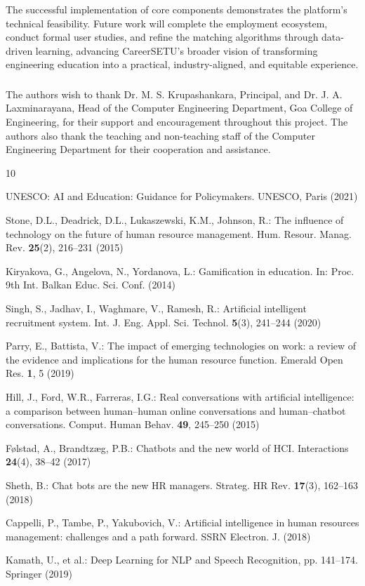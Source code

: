 \documentclass[runningheads]{llncs}
\begin{document}
The successful implementation of core components demonstrates the platform's technical feasibility. Future work will complete the employment ecosystem, conduct formal user studies, and refine the matching algorithms through data-driven learning, advancing CareerSETU's broader vision of transforming engineering education into a practical, industry-aligned, and equitable experience.

\begin{credits}
\subsubsection{\ackname} The authors wish to thank Dr. M. S. Krupashankara, Principal, and Dr. J. A. Laxminarayana, Head of the Computer Engineering Department, Goa College of Engineering, for their support and encouragement throughout this project. The authors also thank the teaching and non-teaching staff of the Computer Engineering Department for their cooperation and assistance.
\end{credits}

\begin{thebibliography}{10}

UNESCO: AI and Education: Guidance for Policymakers. UNESCO, Paris (2021)

Stone, D.L., Deadrick, D.L., Lukaszewski, K.M., Johnson, R.: The influence of technology on the future of human resource management. Hum. Resour. Manag. Rev. \textbf{25}(2), 216--231 (2015)

Kiryakova, G., Angelova, N., Yordanova, L.: Gamification in education. In: Proc. 9th Int. Balkan Educ. Sci. Conf. (2014)

Singh, S., Jadhav, I., Waghmare, V., Ramesh, R.: Artificial intelligent recruitment system. Int. J. Eng. Appl. Sci. Technol. \textbf{5}(3), 241--244 (2020)

Parry, E., Battista, V.: The impact of emerging technologies on work: a review of the evidence and implications for the human resource function. Emerald Open Res. \textbf{1}, 5 (2019)

Hill, J., Ford, W.R., Farreras, I.G.: Real conversations with artificial intelligence: a comparison between human--human online conversations and human--chatbot conversations. Comput. Human Behav. \textbf{49}, 245--250 (2015)

F\o lstad, A., Brandtz\ae g, P.B.: Chatbots and the new world of HCI. Interactions \textbf{24}(4), 38--42 (2017)

Sheth, B.: Chat bots are the new HR managers. Strateg. HR Rev. \textbf{17}(3), 162--163 (2018)

Cappelli, P., Tambe, P., Yakubovich, V.: Artificial intelligence in human resources management: challenges and a path forward. SSRN Electron. J. (2018)

Kamath, U., et al.: Deep Learning for NLP and Speech Recognition, pp. 141--174. Springer (2019)

\end{thebibliography}
\end{document}
